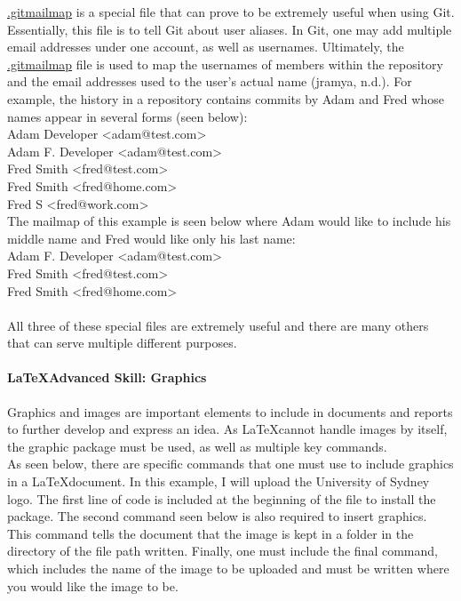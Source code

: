 \documentclass[a4paper, 11pt]{report}
\begin{document}
    \underline{.gitmailmap} is a special file that can prove to be extremely useful when using Git. Essentially, this file is to tell Git about user aliases. In Git, one may add multiple email addresses under one account, as well as usernames. Ultimately, the \underline{.gitmailmap} file is used to map the usernames of members within the repository and the email addresses used to the user’s actual name (jramya, n.d.). For example, the history in a repository contains commits by Adam and Fred whose names appear in several forms (seen below):
    \\
    Adam Developer <adam@test.com>
    \\
    Adam F. Developer <adam@test.com>
    \\
    Fred Smith <fred@test.com>
    \\
    Fred Smith <fred@home.com>
    \\
    Fred S <fred@work.com>
    \\
    The mailmap of this example is seen below where Adam would like to include his middle name and Fred would like only his last name:
    \\
    Adam F. Developer <adam@test.com>
    \\
    Fred Smith <fred@test.com>
    \\
    Fred Smith <fred@home.com>
    \\
    \\
    All three of these special files are extremely useful and there are many others that can serve multiple different purposes. 


    
    
    \paragraph{\LaTeX \space Advanced Skill: Graphics} Graphics and images are important elements to include in documents and reports to further develop and express an idea. As \LaTeX \space cannot handle images by itself, the graphic package must be used, as well as multiple key commands.
    \\
    As seen below, there are specific commands that one must use to include graphics in a \LaTeX \space document. In this example, I will upload the University of Sydney logo. The first line of code is included at the beginning of the file to install the package. The second command seen below is also required to insert graphics. This command tells the document that the image is kept in a folder in the directory of the file path written. Finally, one must include the final command, which includes the name of the image to be uploaded and must be written where you would like the image to be.
\end{document}

